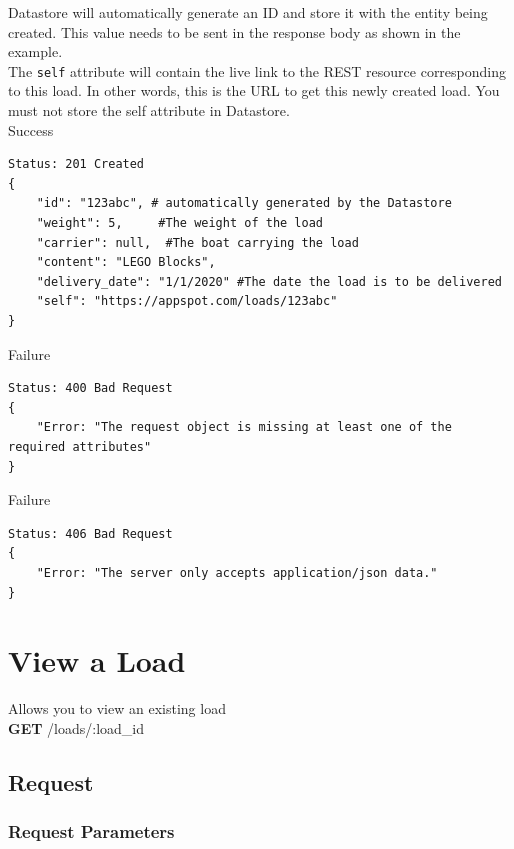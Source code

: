 \documentclass[letterpaper,11pt,titlepage,draftclsnofoot,onecolumn,compsoc,utf8,latin1]{IEEEtran}
\begin{document}
\begin{singlespace}
Datastore will automatically generate an ID and store it with the entity being created. This value needs to be sent in the response body as shown in the example.\\

\noindent The \texttt{self} attribute will contain the live link to the REST resource corresponding to this load. In other words, this is the URL to get this newly created load. You must not store the self attribute in Datastore.\\

\noindent \Large{Success}

\begin{lstlisting}[]
Status: 201 Created
{ 
    "id": "123abc", # automatically generated by the Datastore
    "weight": 5,     #The weight of the load
    "carrier": null,  #The boat carrying the load
    "content": "LEGO Blocks",
    "delivery_date": "1/1/2020" #The date the load is to be delivered
    "self": "https://appspot.com/loads/123abc"
}
\end{lstlisting}

\noindent \Large{Failure}

\begin{lstlisting}[]
Status: 400 Bad Request
{
    "Error: "The request object is missing at least one of the required attributes"
}
\end{lstlisting}

\noindent \Large{Failure}

\begin{lstlisting}[]
Status: 406 Bad Request
{
    "Error: "The server only accepts application/json data."
}
\end{lstlisting}


\newpage 

\normalsize

\section{View a Load}

Allows you to view an existing load\\

\noindent \textbf{GET} /loads/:load\_id

\subsection{Request}

\subsubsection{Request Parameters}


\end{singlespace}
\end{document}
